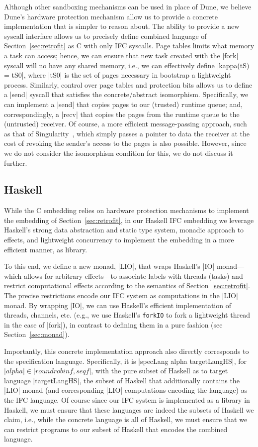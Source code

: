 Although other sandboxing mechanisms can be used in place of Dune, we
believe Dune's hardware protection mechanism allow us to provide a 
concrete implementation that is simpler to reason about.
%
The ability to provide a new syscall interface allows us to precisely
define combined language of Section~\ref{sec:retrofit} as C with only
IFC syscalls.
%
Page tables limits what memory a task can access; hence, we can ensure
that new task created with the |fork| syscall will no have any shared
memory, i.e., we can effectively define |kappa(tS) = tS0|, where |tS0|
is the set of pages necessary in bootstrap a lightweight process.
%
Similarly, control over page tables and protection bits allows us to
define a |send| syscall that satisfies the concrete/abstract
isomorphism.
%
Specifically, we can implement a |send| that copies pages to our
(trusted) runtime queue; and, correspondingly, a |recv| that copies
the pages from the runtime queue to the (untrusted) receiver.
%
Of course, a more efficient message-passing approach, such as that of
Singularity~\tocite{}, which simply passes a pointer to data the
receiver at the cost of revoking the sender's access to the pages is
also possible.
%
However, since we do not consider the isomorphism condition for this,
we do not discuss it further.


\subsection{Haskell}
\label{sec:real:hs}
While the C embedding relies on hardware protection mechanisms to
implement the embedding of Section~\ref{sec:retrofit}, in our Haskell
IFC embedding we leverage Haskell's strong data abstraction and static
type system, monadic approach to effects, and lightweight concurrency
to implement the embedding in a more efficient manner, as library.

To this end, we define a new monad, |LIO|, that wraps Haskell's |IO|
monad---which allows for arbitrary effects---to associate labels with
threads (tasks) and restrict computational effects according to the
semantics of Section~\ref{sec:retrofit}.
%
The precise restrictions encode our IFC system as computations in the
|LIO| monad.
%
By wrapping |IO|, we can use Haskell's efficient implementation of
threads, channels, etc. (e.g., we use Haskell's \texttt{forkIO} to
fork a lightweight thread in the case of |fork|), in contrast to
defining them in a pure fashion (see Section~\ref{sec:monad}).

Importantly, this concrete implementation approach also directly
corresponds to the specification language.
%
Specifically, it is |specLang alpha targetLangHS|, for $|alpha| \in
|{roundrobinf, seqf}|$, with the pure subset of Haskell as to target
language |targetLangHS|, the subset of Haskell that additionally
contains the |LIO| monad (and corresponding |LIO| computations
encoding the language) as the IFC language.
%
Of course since our IFC system is implemented as a library in Haskell,
we must ensure that these languages are indeed the subsets of Haskell
we claim, i.e., while the concrete language is all of Haskell, we must
ensure that we can restrict programs to our subset of Haskell that
encodes the combined language.
%

